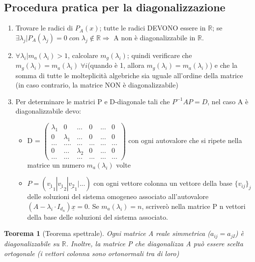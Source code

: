 \documentclass[12pt]{article}
\newenvironment{para}{\begin{adjustwidth}{13mm}{}}{\end{adjustwidth}}
\newtheorem{Teorema}{Teorema}[subsection]
\begin{document}
\begin{para}
\subsection{Procedura pratica per la diagonalizzazione}
\begin{enumerate}
    \item Trovare le radici di $P_A(x)$; tutte le radici DEVONO essere in $\mathbb{R}$; se $\exists \lambda_j | P_A(\lambda_j) = 0 \; con \; \lambda_j \notin \mathbb{R} \Rightarrow $ A non è diagonalizzabile in $\mathbb{R}$.
    \item $\forall \lambda_i | m_a(\lambda_i)>1$, calcolare $m_g(\lambda_i)$; quindi verificare che $m_g(\lambda_i) = m_a(\lambda_i) \; \forall i$(quando è 1, allora $m_g(\lambda_i) = m_a(\lambda_i)$) e che la somma di tutte le molteplicità algebriche sia uguale all'ordine della matrice (in caso contrario, la matrice NON è diagonalizzabile)
    \item Per determinare le matrici P e D-diagonale tali che $P^{-1}AP = D$, nel caso A è diagonalizzabile devo: \begin{itemize}
        \item D = $\begin{pmatrix}
            \lambda_1 & 0 & ... & 0 & ... & 0\\
            0 & \lambda_1 &...& 0 &...&0\\
            ...&....&...&... &...&...\\
            0  & ...& \lambda_2 & 0 &...&0 \\
            ...&...&...&...&...&...
        \end{pmatrix}$ \newline con ogni autovalore che si ripete nella matrice un numero $m_a(\lambda_i)$ volte
        \item $P = (\underline{v_1}_1 | \underline{v_1}_2 | \underline{v_2}_1 |...)$ con ogni vettore colonna un vettore della base $\{v_{ij}\}_j$ delle soluzioni del sistema omogeneo associato all'autovalore \newline $(A-\lambda_i \cdot I_{d_n})\underline{x} = 0$. Se $m_a(\lambda_i) = n$, scriverò nella matrice P n vettori della base delle soluzioni del sistema associato.
    \end{itemize} 
\end{enumerate}
\begin{Teorema}[Teorema spettrale]
Ogni matrice A reale simmetrica ($a_{ij} = a_{jI}$) è diagonalizzabile su $\mathbb{R}$. Inoltre, la matrice P che diagonalizza A può essere scelta ortogonale (i vettori colonna sono ortonormali tra di loro)
\end{Teorema}
\newpage

\end{para}
\end{document}
